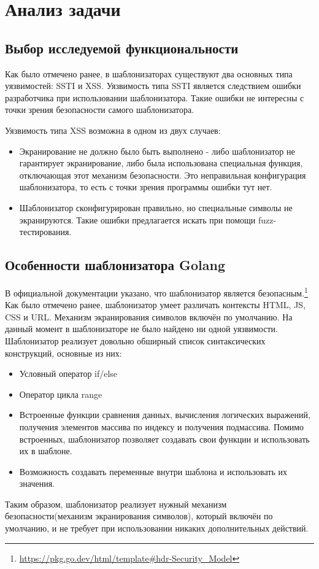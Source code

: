 \documentclass[a4paper]{article}
\begin{document}
\newpage
\section{Анализ задачи}
\indent

\subsection{Выбор исследуемой функциональности}

Как было отмечено ранее, в шаблонизаторах существуют два основных типа уязвимостей: SSTI и XSS.
Уязвимость типа SSTI является следствием ошибки разработчика при использовании шаблонизатора. Такие ошибки не интересны с точки зрения безопасности самого шаблонизатора. 

Уязвимость типа XSS возможна в одном из двух случаев:

\begin{itemize}
    \item Экранирование не должно было быть выполнено - либо шаблонизатор не гарантирует экранирование, либо была использована специальная функция, отключающая этот механизм безопасности. Это неправильная конфигурация шаблонизатора, то есть с точки зрения программы ошибки тут нет.
    \item Шаблонизатор сконфигурирован правильно, но специальные символы не экранируются. Такие ошибки предлагается искать при помощи fuzz-тестирования.
\end{itemize}

\subsection{Особенности шаблонизатора Golang}
В официальной документации указано, что шаблонизатор является безопасным.\footnote{\href{https://pkg.go.dev/html/template\#hdr-Security\_Model}{https://pkg.go.dev/html/template\#hdr-Security\_Model}} Как было отмечено ранее, шаблонизатор умеет различать контексты HTML, JS, CSS и URL. Механизм экранирования символов включён по умолчанию. На данный момент в шаблонизаторе не было найдено ни одной уязвимости. Шаблонизатор реализует довольно обширный список синтаксических конструкций, основные из них: 
\begin{itemize}
    \item Условный оператор if/else
    \item Оператор цикла range
    \item Встроенные функции сравнения данных, вычисления логических выражений, получения элементов массива по индексу и получения подмассива. Помимо встроенных, шаблонизатор позволяет создавать свои функции и использовать их в шаблоне.
    \item Возможность создавать переменные внутри шаблона и использовать их значения.
\end{itemize}
Таким образом, шаблонизатор реализует нужный механизм безопасности(механизм экранирования символов), который включён по умолчанию, и не требует при использовании никаких дополнительных действий.
\end{document}
